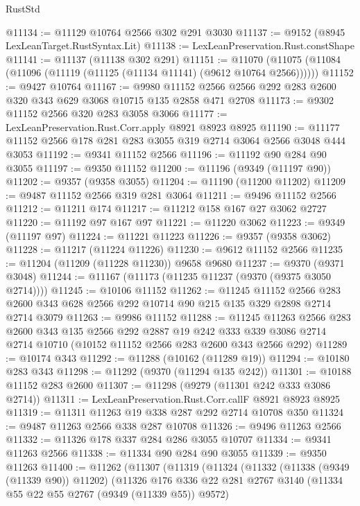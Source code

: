 \begin{lexlean}{RustStd}
\begin{coremodule}
{\begin{coremodule}
{{{{{{{{{{{{{{{{{{{{{{{{{{{{{{{{{{{{{{{@11134 := @11129 @10764 @2566 @302 @291 @3030
@11137 := @9152 (@8945 LexLeanTarget.RustSyntax.Lit)
@11138 := LexLeanPreservation.Rust.constShape
@11141 := @11137 (@11138 @302 @291)
@11151 := @11070 (@11075 (@11084 (@11096 (@11119 (@11125 (@11134 @11141) (@9612 @10764 @2566))))))
@11152 := @9427 @10764
@11167 := @9980 @11152 @2566 @2566 @292 @283 @2600 @320 @343 @629 @3068 @10715 @135 @2858 @471 @2708
@11173 := @9302 @11152 @2566 @320 @283 @3058 @3066
@11177 := LexLeanPreservation.Rust.Corr.apply @8921 @8923 @8925
@11190 := @11177 @11152 @2566 @178 @281 @283 @3055 @319 @2714 @3064 @2566 @3048 @444 @3053
@11192 := @9341 @11152 @2566
@11196 := @11192 @90 @284 @90 @3055
@11197 := @9350 @11152
@11200 := @11196 (@9349 (@11197 @90))
@11202 := @9357 (@9358 @3055)
@11204 := @11190 (@11200 @11202)
@11209 := @9487 @11152 @2566 @319 @281 @3064
@11211 := @9496 @11152 @2566
@11212 := @11211 @174
@11217 := @11212 @158 @167 @27 @3062 @2727
@11220 := @11192 @97 @167 @97
@11221 := @11220 @3062
@11223 := @9349 (@11197 @97)
@11224 := @11221 @11223
@11226 := @9357 (@9358 @3062)
@11228 := @11217 (@11224 @11226)
@11230 := @9612 @11152 @2566
@11235 := @11204 (@11209 (@11228 @11230)) @9658 @9680
@11237 := @9370 (@9371 @3048)
@11244 := @11167 (@11173 (@11235 @11237 (@9370 (@9375 @3050 @2714))))
@11245 := @10106 @11152
@11262 := @11245
    @11152
    @2566
    @283
    @2600
    @343
    @628
    @2566
    @292
    @10714
    @90
    @215
    @135
    @329
    @2898
    @2714
    @2714
    @3079
@11263 := @9986 @11152
@11288 := @11245
    @11263
    @2566
    @283
    @2600
    @343
    @135
    @2566
    @292
    @2887
    @19
    @242
    @333
    @339
    @3086
    @2714
    @2714
    @10710
    (@10152 @11152 @2566 @283 @2600 @343 @2566 @292)
@11289 := @10174 @343
@11292 := @11288 (@10162 (@11289 @19))
@11294 := @10180 @283 @343
@11298 := @11292 (@9370 (@11294 @135 @242))
@11301 := @10188 @11152 @283 @2600
@11307 := @11298 (@9279 (@11301 @242 @333 @3086 @2714))
@11311 := LexLeanPreservation.Rust.Corr.callF @8921 @8923 @8925
@11319 := @11311 @11263 @19 @338 @287 @292 @2714 @10708 @350
@11324 := @9487 @11263 @2566 @338 @287 @10708
@11326 := @9496 @11263 @2566
@11332 := @11326 @178 @337 @284 @286 @3055 @10707
@11334 := @9341 @11263 @2566
@11338 := @11334 @90 @284 @90 @3055
@11339 := @9350 @11263
@11400 := @11262
    (@11307
      (@11319
        (@11324
          (@11332
            (@11338 (@9349 (@11339 @90)) @11202)
            (@11326
              @176
              @336
              @22
              @281
              @2767
              @3140
              (@11334 @55 @22 @55 @2767 (@9349 (@11339 @55)) @9572)
}}}}}}}}}}}}}}}}}}}}}}}}}}}}}}}}}}}}}}}
\end{coremodule}}
\end{coremodule}
\end{lexlean}
